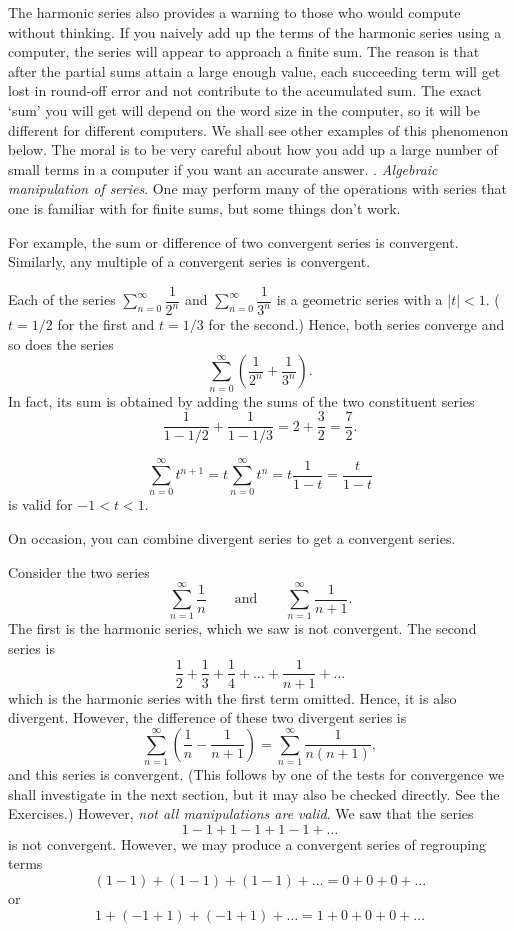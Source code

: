 \medskip
The harmonic series also provides a warning to those who would
compute without thinking.   If you naively add up the terms
of the harmonic series using a computer, the series will appear to
approach a finite sum.  The reason is that after the partial
sums attain a large enough value, each succeeding term will
get lost in round-off error and not contribute to the accumulated
sum.   The exact `sum' you will get will depend on the word
size in the computer, so it will be different for different
computers.  We shall see other examples of this phenomenon below.
The moral is to be very careful about how you add up a large
number of small terms in a computer if you want an accurate
answer.
. {\it Algebraic manipulation of series}.     One may perform
many of the operations with series that one is familiar
with for finite sums, but some things don't work.

For example, the sum or difference of two convergent series
is convergent.  Similarly, any  multiple of  a convergent
series is convergent.

\nextex
{}  Each of the series $\sum_{n=0}^\infty
\dfrac 1{2^n}$ and $\sum_{n=0}^\infty\dfrac 1{3^n}$ is a
geometric series with a $|t| < 1$.  ($t = 1/2$ for the first
and $t = 1/3$ for the second.)  Hence, both series converge
and so does the series
$$
\sum_{n=0}^\infty \left(\frac 1{2^n} + \frac 1{3^n}\right).
$$
In fact, its sum is obtained by adding the sums of the two
constituent series
$$
  \frac 1{1 - 1/2} + \frac 1{1 - 1/3} = 2 + \frac 32 = \frac 72.
$$
\endexample

\nextex
{}
$$
\sum_{n=0}^\infty t^{n+1} = t\sum_{n=0}^\infty t^n = t\frac 1{1-t} = 
\frac t{1-t}
$$
is valid for $-1 < t < 1$.
\endexample

On occasion, you can combine divergent series to get a
convergent series.

\nextex
{}  Consider the two series
$$
\sum_{n=1}^\infty \frac 1n\qquad\text{and}\qquad
\sum_{n=1}^\infty \frac 1{n+1}.
$$
The first is the harmonic series, which we saw is not convergent.
The second series is
$$
\frac 12 + \frac 13 + \frac 14 + \dots + \frac 1{n+1} + \dots
$$
which is the harmonic series with the first term omitted.  Hence,
it is also divergent.  However, the difference of these two
divergent series is
$$
\sum_{n=1}^\infty \left(\frac 1n - \frac 1{n+1}\right)
=
\sum_{n=1}^\infty \frac 1{n(n + 1)},
$$
and this series is convergent.  (This follows by one of the
tests for convergence we shall investigate in the next section,
but it may also be checked directly.  See the
Exercises.)
\medskip
However, {\it not all manipulations are valid}.
\nextex
{}  We saw that the series
$$
1 - 1 + 1 - 1 + 1 - 1 + \dots
$$
is not convergent.  However, we may produce a convergent series
of regrouping terms
$$
(1 - 1) + (1 - 1) + (1 - 1) + \dots = 0 + 0 + 0 + \dots
$$
or
$$
1 + (-1 + 1) + (-1 + 1) + \dots = 1 + 0 + 0 + 0 + \dots
$$
\endexample

